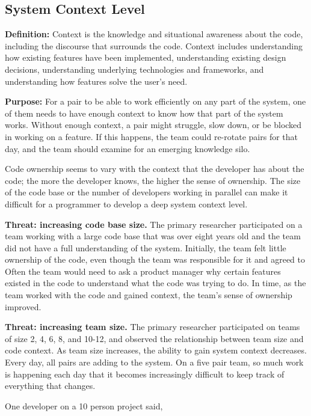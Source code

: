 \subsection{System Context Level}
\textbf{Definition:} Context is the knowledge and situational awareness about the code, including the discourse that surrounds the code. Context includes  understanding how existing features have been implemented, understanding existing design decisions, understanding underlying technologies and frameworks, and understanding how features solve the user’s need.


\textbf{Purpose:} For a pair to be able to work efficiently on any part of the system, one of them needs to have enough context to know how that part of the system works. Without enough context, a pair might struggle, slow down, or be blocked in working on a feature. If this happens, the team could re-rotate pairs for that day, and the team should examine for an emerging knowledge silo. 

Code ownership seems to vary with the context that the developer has about the code; the more the developer knows, the higher the sense of ownership. The size of the code base or the number of developers working in parallel can make it difficult for a programmer to develop a deep system context level.

\textbf{Threat: increasing code base size.} The primary researcher participated on a team working with a large code base that was over eight years old and the team did not have a full understanding of the system. Initially, the team felt little ownership of the code, even though the team was responsible for it and agreed to  Often the team would need to ask a product manager why certain features existed in the code to understand what the code was trying to do. In time, as the team worked with the code and gained context, the team’s sense of ownership improved.

\textbf{Threat: increasing team size.} The primary researcher participated on teams of size 2, 4, 6, 8, and 10-12, and observed the relationship between team size and code context. As team size increases, the ability to gain system context decreases. Every day, all pairs are adding to the system. On a five pair team, so much work is happening each day that it becomes increasingly difficult to keep track of everything that changes.

One developer on a 10 person project said, 

